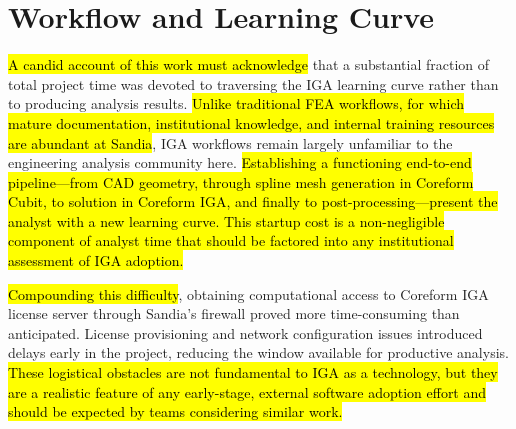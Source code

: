 \documentclass[12pt,report,justified]{SANDreport}
\begin{document}

\section{Workflow and Learning Curve}

\hl{A candid account of this work must acknowledge} that a substantial fraction of total
project time was devoted to traversing the IGA learning curve rather than to producing
analysis results.  \hl{Unlike traditional FEA workflows, for which mature documentation,
institutional knowledge, and internal training resources are abundant at Sandia}, IGA
workflows remain largely unfamiliar to the engineering analysis community here.
\hl{Establishing a functioning end-to-end pipeline---from CAD geometry, through spline mesh
generation in Coreform Cubit, to solution in Coreform IGA, and finally to
post-processing---present the analyst with a new learning curve.  This startup cost
is a non-negligible component of analyst time that should be factored into any
institutional assessment of IGA adoption.}

\hl{Compounding this difficulty}, obtaining computational access to Coreform IGA license server through Sandia's firewall proved more time-consuming than anticipated.  License
provisioning and network configuration issues introduced delays early in the project,
reducing the window available for productive analysis.  \hl{These logistical obstacles are
not fundamental to IGA as a technology, but they are a realistic feature of any
early-stage, external software adoption effort and should be expected by teams considering similar work.}
\end{document}
